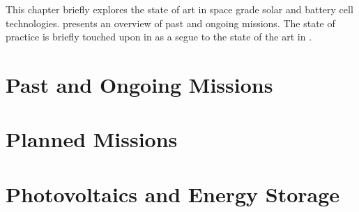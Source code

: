This chapter briefly explores the state of art in space grade solar and battery cell technologies.  presents an overview of past and ongoing missions. The state of practice is briefly touched upon in  as a segue to the state of the art in .

\section{Past and Ongoing Missions}
\label{sec:StateOfTheArt:PastAndOngoingMissions}


\clearpage
\section{Planned Missions}
\label{sec:StateOfTheArt:PlannedMissions}


\clearpage
\section{Photovoltaics and Energy Storage}
\label{sec:StateOfTheArt:PhotovoltaicsAndEnergyStorage}


